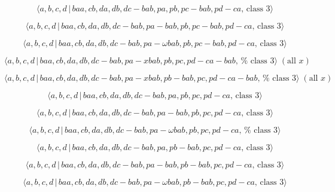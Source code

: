 \documentclass[10pt]{article}
\begin{document}
\begin{equation}
\langle a,b,c,d\,|\,baa,cb,da,db,dc-bab,pa,pb,pc-bab,pd-ca,\,\text{class }%
3\rangle  \tag{7.4023}
\end{equation}

\begin{equation}
\langle a,b,c,d\,|\,baa,cb,da,db,dc-bab,pa-bab,pb,pc-bab,pd-ca,\,\text{class 
}3\rangle  \tag{7.4024}
\end{equation}

\begin{equation}
\langle a,b,c,d\,|\,baa,cb,da,db,dc-bab,pa-\omega bab,pb,pc-bab,pd-ca,\,%
\text{class }3\rangle  \tag{7.4025}
\end{equation}

\begin{equation}
\langle a,b,c,d\,|\,baa,cb,da,db,dc-bab,pa-xbab,pb,pc,pd-ca-bab,\,\text{%
class }3\rangle \;(\text{all }x)  \tag{7.4026}
\end{equation}

\begin{equation}
\langle a,b,c,d\,|\,baa,cb,da,db,dc-bab,pa-xbab,pb-bab,pc,pd-ca-bab,\,\text{%
class }3\rangle \;(\text{all }x)  \tag{7.4027}
\end{equation}

\begin{equation}
\langle a,b,c,d\,|\,baa,cb,da,db,dc-bab,pa,pb,pc,pd-ca,\,\text{class }%
3\rangle  \tag{7.4028}
\end{equation}

\begin{equation}
\langle a,b,c,d\,|\,baa,cb,da,db,dc-bab,pa-bab,pb,pc,pd-ca,\,\text{class }%
3\rangle  \tag{7.4029}
\end{equation}

\begin{equation}
\langle a,b,c,d\,|\,baa,cb,da,db,dc-bab,pa-\omega bab,pb,pc,pd-ca,\,\text{%
class }3\rangle  \tag{7.4030}
\end{equation}

\begin{equation}
\langle a,b,c,d\,|\,baa,cb,da,db,dc-bab,pa,pb-bab,pc,pd-ca,\,\text{class }%
3\rangle  \tag{7.4031}
\end{equation}

\begin{equation}
\langle a,b,c,d\,|\,baa,cb,da,db,dc-bab,pa-bab,pb-bab,pc,pd-ca,\,\text{class 
}3\rangle  \tag{7.4032}
\end{equation}

\begin{equation}
\langle a,b,c,d\,|\,baa,cb,da,db,dc-bab,pa-\omega bab,pb-bab,pc,pd-ca,\,%
\text{class }3\rangle  \tag{7.4033}
\end{equation}
\end{document}
